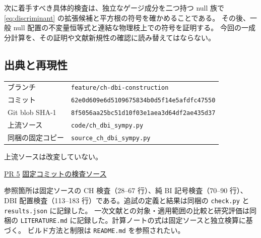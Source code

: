 \documentclass[11pt,a4paper]{article}
\begin{document}
次に着手すべき具体的検査は、独立なゲージ成分を二つ持つ null 族で
\eqref{eq:discriminant} の拡張候補と平方根の符号を確かめることである。
その後、一般 null 配置の不変量恒等式と連結な物理枝上での符号を証明する。
今回の一成分計算を、その証明や文献新規性の確認に読み替えてはならない。

\subsection*{出典と再現性}
\small
\noindent
\begin{tabular}{@{}ll@{}}
ブランチ & \texttt{feature/ch-dbi-construction}\\
コミット & \texttt{62e0d609e6d5109675834b0d5f14e5afdfc47550}\\
Git blob SHA-1 & \texttt{8f5056aa25bc51d10f03e1aea3d64df2ae435d37}\\
上流ソース & \texttt{code/ch\_dbi\_sympy.py}\\
同梱の固定コピー & \texttt{source\_ch\_dbi\_sympy.py}
\end{tabular}\par
上流ソースは改変していない。\par
\noindent
\href{https://github.com/ryos-physrockme/dbi-stress-tensor-flow/pull/5}{PR 5}\quad
\href{https://github.com/ryos-physrockme/dbi-stress-tensor-flow/blob/62e0d609e6d5109675834b0d5f14e5afdfc47550/code/ch_dbi_sympy.py}{固定コミットの検査ソース}\par
\noindent
参照箇所は固定ソースの CH 検査（28--67 行）、純 BI 記号検査（70--90 行）、
DBI 配置検査（113--183 行）である。追試の定義と結果は同梱の
\texttt{check.py} と \texttt{results.json} に記録した。
一次文献との対象・適用範囲の比較と研究評価は同梱の
\texttt{LITERATURE.md} に記録した。計算ノートの式は固定ソースと独立検算に基づく。
ビルド方法と制限は \texttt{README.md} を参照されたい。
\end{document}
